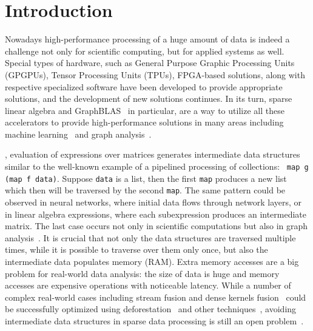 \section{Introduction}

Nowadays high-performance processing of a huge amount of data is indeed a challenge not only for scientific computing, but for applied systems as well.
Special types of hardware, such as General Purpose Graphic Processing Units (GPGPUs), Tensor Processing Units (TPUs), FPGA-based solutions, along with respective specialized software have been developed to provide appropriate solutions, and the development of new solutions continues.
In its turn, sparse linear algebra and GraphBLAS~\cite{buluc2017graphblas} in particular, are a way to utilize all these accelerators to provide high-performance solutions in many areas including machine learning~\cite{Kepner2017} and graph analysis~\cite{graphblast}.


, evaluation of expressions over matrices generates intermediate data structures similar to the well-known example of a pipelined processing of collections: \verb| map g (map f data)|. Suppose \verb|data| is a list, then the first \verb|map| produces a new list which then will be traversed by the second \verb|map|. The same pattern could be observed in neural networks, where initial data flows through network layers, or in linear algebra expressions, where each subexpression produces an intermediate matrix. 
The last case occurs not only in scientific computations but also in graph analysis~\cite{graphblast}.
It is crucial that not only the data structures are traversed multiple times, while it is possible to traverse over them only once, but also the intermediate data populates memory (RAM).
Extra memory accesses are a big problem for real-world data analysis: the size of data is huge and memory accesses are expensive operations with noticeable latency.
While a number of complex real-world cases including stream fusion and dense kernels fusion~\cite{fusion-boosting-memory-computations} could be successfully optimized using deforestation~\cite{wadler-deforestation,wadler-deforestation-ho} and other techniques~\cite{Futhark,StreamFus}, avoiding intermediate data structures in sparse data processing is still an open problem~\cite{graphblast}.
